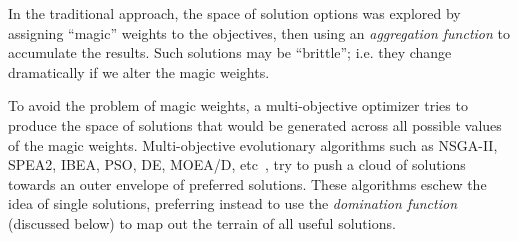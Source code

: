 \documentclass[10pt,journal,compsoc]{IEEEtran}
\newenvironment{changed}{\par\color{MyDarkBlue}}{\par}
\begin{document}
\begin{changed}
In the traditional approach, the space of solution options
was explored by assigning
``magic'' weights to the objectives, then using an {\em aggregation function} to accumulate
the results. Such solutions may be  ``brittle'';
i.e. they
change dramatically if we alter the magic weights.  

To avoid the problem
of magic weights, a multi-objective optimizer tries to produce the space of solutions
that would be generated across all possible values of the magic weights.
Multi-objective evolutionary algorithms
such as NSGA-II, SPEA2, IBEA, PSO, DE, MOEA/D, etc~\cite{deb00afast,zit02,Zitzler04indicator-basedselection,Poli07particleswarm,585892,zhang07},
try to push
a cloud of solutions towards an outer envelope of
preferred solutions.
These algorithms eschew the idea of
single solutions, preferring instead to use the {\em domination function} (discussed below) to
map out the
terrain of all useful solutions.
\end{changed}
 
\end{document}

